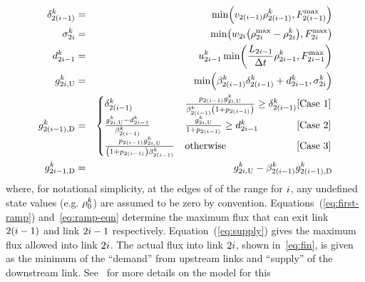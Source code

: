 \begin{eqnarray}
\demand_{2\left(\link-1\right)}^{\tind} & = & \min\left(\ffspeed_{2\left(i-1\right)}\densitydiscrete{2\left(\link-1\right)}{\tind},F_{2\left(\link-1\right)}^{\max}\right)\label{eq:first-ramp}\\
\supply_{2\link}^{\tind} & = & \min\left(\congspeed_{2i}\left(\density_{2i}^{\max}-\densitydiscrete{2\link}{\tind}\right),F_{2i}^{\max}\right)\label{eq:supply}\\
\rampDemand_{2\link-1}^{\tind} & = & \ramp_{2\link-1}^{\tind}\min\left(\frac{\length_{2\link-1}}{\Delta t}\densitydiscrete{2\link-1}{\tind},F_{2i-1}^{\max}\right)\label{eq:ramp-eqn}\\
\fin{2\link}{\tind} & = & \min\left(\splitratio_{2\left(\link-1\right)}^{\tind}\demand_{2\left(\link-1\right)}^{\tind}+\rampDemand_{2\link-1}^{\tind},\supply_{2\link}^{\tind}\right)\label{eq:fin}\\
\fout{2\left(\link-1\right)}{\tind} & = & \begin{cases}
\demand_{2\left(\link-1\right)}^{\tind} & \frac{p_{2(\link-1)}\fin{2\link}{\tind}}{\splitratio_{2\left(\link-1\right)}^{\tind}\left(1+p_{2(\link-1)}\right)}\ge\demand_{2\left(\link-1\right)}^{\tind}\hfill\text{[Case 1]}\\
\frac{\fin{2\link}{\tind}-\rampDemand_{2\link-1}^{\tind}}{\splitratio_{2\left(\link-1\right)}^{\tind}} & \frac{\fin{2\link}{\tind}}{1+p_{2(\link-1)}}\ge\rampDemand_{2\link-1}^{\tind}\hfill\text{[Case 2}]\\
\frac{p_{2(\link-1)}\fin{2\link}{\tind}}{\left(1+p_{2(\link-1)}\right)\splitratio_{2\left(\link-1\right)}^{\tind}} & \text{otherwise}\hfill[\text{Case 3]}
\end{cases}\label{eq:merge}\\
\fout{2\link-1}{\tind} & = & \fin{2\link}{\tind}-\splitratio_{2\left(\link-1\right)}^{\tind}\fout{2\left(\link-1\right)}{\tind}\label{eq:last-ramp}
\end{eqnarray}
where, for notational simplicity, at the edges of of the range for
$i$, any undefined state values (e.g. $\rho_{0}^{k}$)
are assumed to be zero by convention. Equations~(\eqref{eq:first-ramp})
and~\eqref{eq:ramp-eqn} determine the maximum flux that can exit
link $2(i-1)$ and link $2i-1$ respectively. Equation~(\eqref{eq:supply})
gives the maximum flux allowed into link $2i$. The actual flux
into link $2i$, shown in~\eqref{eq:fin}, is given as the minimum
of the ``demand'' from upstream links and ``supply'' of the downstream
link. See~\cite{Monache2013} for more details on the model for this
